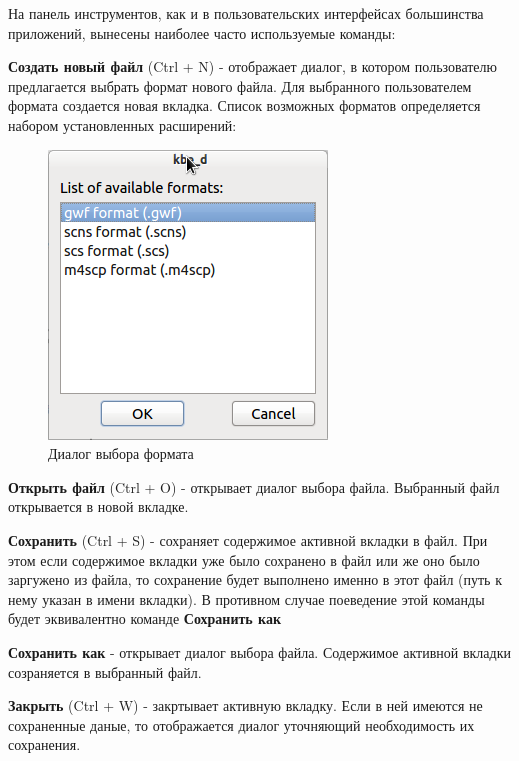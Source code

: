 На панель инструментов, как и в пользовательских интерфейсах большинства приложений, вынесены наиболее часто используемые команды:
\begin{list}{•}{}
	\item \textbf{Создать новый файл} (Ctrl + N) - отображает диалог, в котором пользователю предлагается выбрать формат нового файла.
	Для выбранного пользователем формата создается новая вкладка. Список возможных форматов определяется набором установленных расширений:
	
	\begin{figure}[h]
		\begin{center}
			\includegraphics[scale=0.7]{../images/new_dialog.png}
		\end{center}
		\caption{Диалог выбора формата}
		\label{pic_new_dialog}
	\end{figure}
	
	
	\item \textbf{Открыть файл} (Ctrl + O) - открывает диалог выбора файла. Выбранный файл открывается в новой вкладке.
	\item \textbf{Сохранить} (Ctrl + S) - сохраняет содержимое активной вкладки в файл. При этом если содержимое вкладки 
	уже было сохранено в файл или же оно было заргужено из файла, то сохранение будет выполнено именно в этот файл (путь к нему указан в имени вкладки).
	В противном случае поеведение этой команды будет эквивалентно команде \textbf{Сохранить как}
	\item \textbf{Сохранить как} - открывает диалог выбора файла. Содержимое активной вкладки созраняется в выбранный файл.
	\item \textbf{Закрыть} (Ctrl + W) - закртывает активную вкладку. Если в ней имеются не сохраненные даные, то отображается диалог уточняющий необходимость
	их сохранения.
\end{list}

